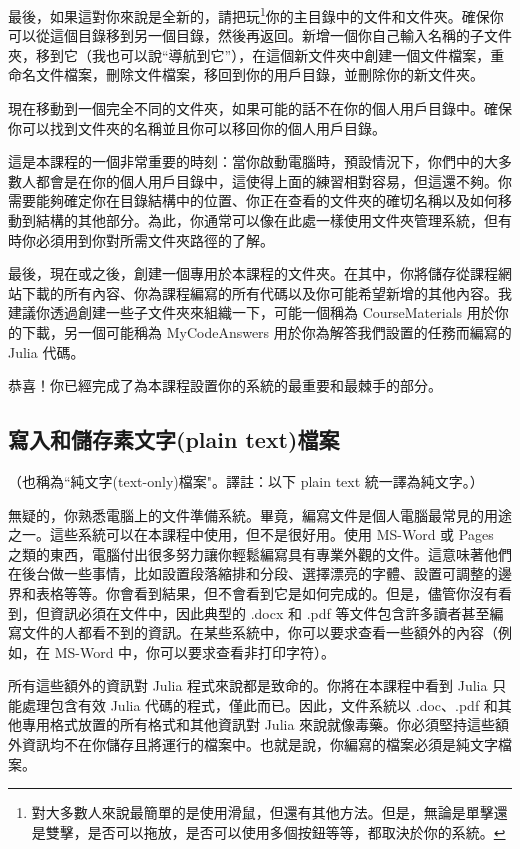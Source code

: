 \documentclass[]{article}
\begin{document}
最後，如果這對你來說是全新的，請把玩\footnote{對大多數人來說最簡單的是使用滑鼠，但還有其他方法。但是，無論是單擊還是雙擊，是否可以拖放，是否可以使用多個按鈕等等，都取決於你的系統。}你的主目錄中的文件和文件夾。確保你可以從這個目錄移到另一個目錄，然後再返回。新增一個你自己輸入名稱的子文件夾，移到它（我也可以說``導航到它''），在這個新文件夾中創建一個文件檔案，重命名文件檔案，刪除文件檔案，移回到你的用戶目錄，並刪除你的新文件夾。

現在移動到一個完全不同的文件夾，如果可能的話不在你的個人用戶目錄中。確保你可以找到文件夾的名稱並且你可以移回你的個人用戶目錄。

這是本課程的一個非常重要的時刻：當你啟動電腦時，預設情況下，你們中的大多數人都會是在你的個人用戶目錄中，這使得上面的練習相對容易，但這還不夠。你需要能夠確定你在目錄結構中的位置、你正在查看的文件夾的確切名稱以及如何移動到結構的其他部分。為此，你通常可以像在此處一樣使用文件夾管理系統，但有時你必須用到你對所需文件夾路徑的了解。

最後，現在或之後，創建一個專用於本課程的文件夾。在其中，你將儲存從課程網站下載的所有內容、你為課程編寫的所有代碼以及你可能希望新增的其他內容。我建議你透過創建一些子文件夾來組織一下，可能一個稱為 CourseMaterials 用於你的下載，另一個可能稱為 MyCodeAnswers 用於你為解答我們設置的任務而編寫的 Julia 代碼。

恭喜！你已經完成了為本課程設置你的系統的最重要和最棘手的部分。

\subsection*{寫入和儲存素文字(plain text)檔案}

（也稱為``純文字(text-only)檔案"。譯註：以下 plain text 統一譯為純文字。）

無疑的，你熟悉電腦上的文件準備系統。畢竟，編寫文件是個人電腦最常見的用途之一。這些系統可以在本課程中使用，但不是很好用。使用 MS-Word 或 Pages 之類的東西，電腦付出很多努力讓你輕鬆編寫具有專業外觀的文件。這意味著他們在後台做一些事情，比如設置段落縮排和分段、選擇漂亮的字體、設置可調整的邊界和表格等等。你會看到結果，但不會看到它是如何完成的。但是，儘管你沒有看到，但資訊必須在文件中，因此典型的 .docx 和 .pdf 等文件包含許多讀者甚至編寫文件的人都看不到的資訊。在某些系統中，你可以要求查看一些額外的內容（例如，在 MS-Word 中，你可以要求查看非打印字符）。

所有這些額外的資訊對 Julia 程式來說都是致命的。你將在本課程中看到 Julia 只能處理包含有效 Julia 代碼的程式，僅此而已。因此，文件系統以 .doc、.pdf 和其他專用格式放置的所有格式和其他資訊對 Julia 來說就像毒藥。你必須堅持這些額外資訊均不在你儲存且將運行的檔案中。也就是說，你編寫的檔案必須是純文字檔案。
\end{document}
